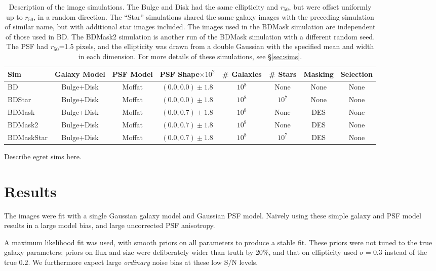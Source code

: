 \documentclass[usegraphicx,usenatbib]{mn2e}
\newcommand{\hlr}{$r_{50}$}
\newcommand{\nsimNgal}{$10^8$}
\newcommand{\nsimNstar}{$10^7$}
\newcommand{\psfdist}{$(0.0,0.7) \pm 1.8$}
\newcommand{\rpsfdist}{$(0.0,0.0) \pm 1.8$}
\begin{document}
\begin{table}
    \centering
    \caption{Description of the image simulations.  The Bulge and Disk
        had the same ellipticity and \hlr, but were
        offset uniformly up to \hlr, in a random direction. The ``Star''
    simulations shared the same galaxy images with the preceding simulation of similar name, but with additional star
images included. The images used in the BDMask simulation are
independent of those used in BD.   The BDMask2 simulation is another run of
the BDMask simulation with a different random seed. The PSF had \hlr=1.5 pixels, and the ellipticity was drawn from a 
double Gaussian with the specified mean and width in each dimension.  
For more details of these simulations, see \S \ref{sec:sims}.  \label{tab:sims}}
    \begin{tabular}{ | l | c | c | c | c | c | c | c |}
        Sim        & Galaxy Model & PSF Model & PSF Shape$\times 10^2$ & \# Galaxies & \# Stars    & Masking & Selection  \\
        \hline
        BD         & Bulge+Disk   & Moffat    & \rpsfdist     &  \nsimNgal   & None        & None    & None  \\
        BDStar     & Bulge+Disk   & Moffat    & \rpsfdist     &  \nsimNgal   & \nsimNstar  & None    & None  \\
        BDMask     & Bulge+Disk   & Moffat    & \psfdist  &  \nsimNgal   & None        & DES     & None  \\
        BDMask2    & Bulge+Disk   & Moffat    & \psfdist  &  \nsimNgal   & None        & DES     & None  \\
        BDMaskStar & Bulge+Disk   & Moffat    & \psfdist  &  \nsimNgal   & \nsimNstar  & DES     & None  \\
    \end{tabular}
\end{table}

Describe egret sims here.


\section{Results} \label{sec:detrendsim}

The images were fit with a single Gaussian galaxy model and Gaussian PSF model.
Naively using these simple galaxy and PSF model results in a large model bias,
and large uncorrected PSF anisotropy.

A maximum likelihood fit was used, with smooth priors on all parameters to
produce a stable fit.  These priors were not tuned to the true galaxy
parameters; priors on flux and size were deliberately wider than truth by 20\%,
and that on ellipticity used $\sigma=0.3$ instead of the true $0.2$.  We
furthermore expect large {\em ordinary} noise bias at these low S/N levels.
\end{document}
